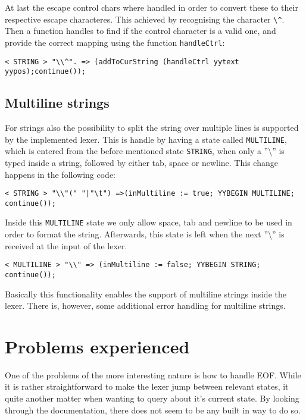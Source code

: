 \documentclass{article}
\begin{document}
At last the escape control chars where handled in order to convert these to their respective escape characteres. This achieved by recognising the character \texttt{\textbackslash \^}. Then a function handles to find if the control character is a valid one, and provide the correct mapping using the function \texttt{handleCtrl}:

\begin{lstlisting}[frame=single]
< STRING > "\\^". => (addToCurString (handleCtrl yytext yypos);continue());
\end{lstlisting}

\subsection{Multiline strings}
For strings also the possibility to split the string over multiple lines is supported by the implemented lexer. This is handle by having a state called \texttt{MULTILINE}, which is entered from the before mentioned state \texttt{STRING}, when only a ''\textbackslash'' is typed inside a string, followed by either tab, space or newline. This change happens in the following code:

\begin{lstlisting}[frame=single]
< STRING > "\\"(" "|"\t") =>(inMultiline := true; YYBEGIN MULTILINE; continue());
\end{lstlisting}

Inside this \texttt{MULTILINE} state we only allow space, tab and newline to be used in order to format the string.
Afterwards, this state is left when the next ''\textbackslash'' is received at the input of the lexer. 
\begin{lstlisting}[frame=single]
< MULTILINE > "\\" => (inMultiline := false; YYBEGIN STRING; continue());
\end{lstlisting}

Basically this functionality enables the support of multiline strings inside the lexer. There is, however, some additional error handling for multiline strings.

\section{Problems experienced}
One of the problems of the more interesting nature is how to handle EOF. While it is rather straightforward to make the lexer jump between relevant states, it quite another matter when wanting to query about it's current state. By looking through the documentation, there does not seem to be any built in way to do so.
\end{document}
